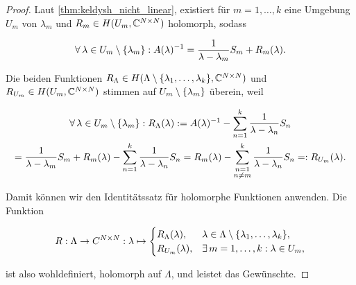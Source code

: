 \begin{proof}

    Laut \ref{thm:keldysh_nicht_linear}, existiert für $m = 1, \dots, k$ eine Umgebung $U_m$ von $\lambda_m$ und $R_m \in H(U_m, \mathbb{C}^{N \times N})$ holomorph, sodass

    \begin{align*}
        \forall \, \lambda \in U_m \setminus {\left \{ \lambda_m \right \}}:
            A(\lambda)^{-1}
            =
            \frac{1}{\lambda - \lambda_m} S_m
            +
            R_m(\lambda).
    \end{align*}

    Die beiden Funktionen $R_\Lambda \in H(\Lambda \setminus {\left \{ \lambda_1, \dots, \lambda_k \right \}}, \mathbb{C}^{N \times N})$ und $R_{U_m} \in H(U_m, \mathbb{C}^{N \times N})$ stimmen auf $U_m \setminus {\left \{ \lambda_m \right \}}$ überein, weil

    \begin{multline*}
        \forall \, \lambda \in U_m \setminus {\left \{ \lambda_m \right \}}:
            R_\Lambda(\lambda)
            :=
            A(\lambda)^{-1}
            -
            \sum_{n=1}^k
                \frac{1}{\lambda - \lambda_n} S_n \\
            =
            \frac{1}{\lambda - \lambda_m} S_m
            +
            R_m(\lambda)
            -
            \sum_{n=1}^k
                \frac{1}{\lambda - \lambda_n} S_n
            =
            R_m(\lambda)
            -
            \sum_{\substack{n = 1 \\ n \neq m}}^k
                \frac{1}{\lambda - \lambda_n} S_n
            =:
            R_{U_m}(\lambda).
    \end{multline*}

    Damit können wir den Identitätssatz für holomorphe Funktionen anwenden.
    Die Funktion

    \begin{align*}
        R:
        \Lambda \to C^{N \times N}:
        \lambda
        \mapsto
        \begin{cases}
            R_\Lambda(\lambda), & \lambda \in \Lambda \setminus {\left \{ \lambda_1, \dots, \lambda_k \right \}}, \\
            R_{U_m}(\lambda),   & \exists \, m = 1, \dots, k: \lambda \in U_m,
        \end{cases}
    \end{align*}

    ist also wohldefiniert, holomorph auf $\Lambda$, und leistet das Gewünschte.

\end{proof}
